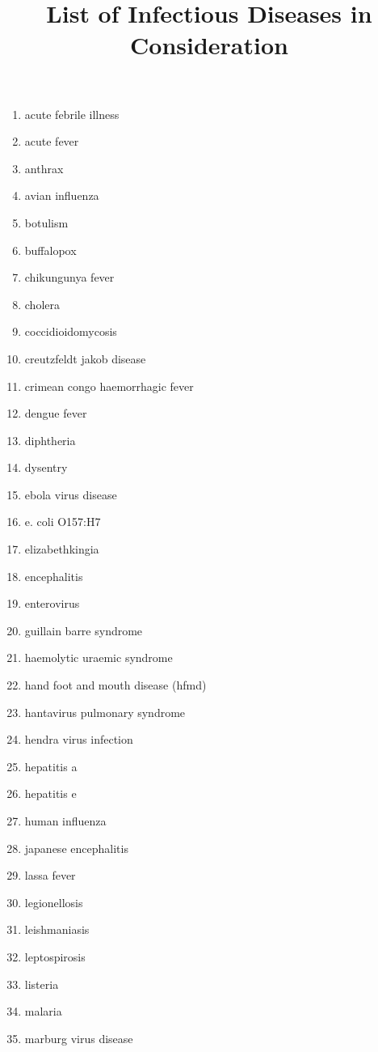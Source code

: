 \documentclass{article}
\title{List of Infectious Diseases in Consideration}
\date{}
\begin{document}
\maketitle

\begin{multicols}{2}
  \begin{enumerate}
    \item acute febrile illness
    \item acute fever
    \item anthrax
    \item avian influenza
    \item botulism
    \item buffalopox
    \item chikungunya fever
    \item cholera
    \item coccidioidomycosis
    \item creutzfeldt jakob disease
    \item crimean congo haemorrhagic fever
    \item dengue fever
    \item diphtheria
    \item dysentry
    \item ebola virus disease
    \item e. coli O157:H7
    \item elizabethkingia
    \item encephalitis
    \item enterovirus
    \item guillain barre syndrome
    \item haemolytic uraemic syndrome
    \item hand foot and mouth disease (hfmd)
    \item hantavirus pulmonary syndrome
    \item hendra virus infection
    \item hepatitis a
    \item hepatitis e
    \item human influenza
    \item japanese encephalitis
    \item lassa fever
    \item legionellosis
    \item leishmaniasis
    \item leptospirosis
    \item listeria
    \item malaria
    \item marburg virus disease

\end{enumerate}
\end{multicols}
\end{document}
